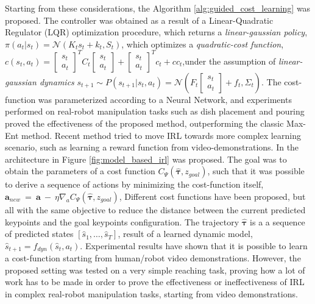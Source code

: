 \label{lqr} Starting from these considerations, the Algorithm \ref{alg:guided_cost_learning} was proposed. The controller was obtained as a result of a Linear-Quadratic Regulator (LQR) optimization procedure, which returns a \textit{linear-gaussian policy}, $\pi(a_{t}|s_{t}) = \mathcal{N}(K_{t}s_{t} + k_{t}, S_{t})$, which optimizes a \textit{quadratic-cost function}, $c(s_{t},a_{t}) = \begin{bmatrix} s_{t} \\ a_{t} \end{bmatrix}^{T}C_{t}\begin{bmatrix} s_{t} \\ a_{t} \end{bmatrix} + \begin{bmatrix} s_{t}\\a_{t}\end{bmatrix}^{T} c_{t} + cc_{t}$,under the assumption of \textit{linear-gaussian dynamics} $s_{t+1} \sim P(s_{t+1}|s_{t},a_{t}) = \mathcal{N}(F_{t}\begin{bmatrix}s_{t}\\ a_{t}\end{bmatrix} + f_{t}, \Sigma_{t})$. The cost-function was parameterized according to a Neural Network, and experiments performed on real-robot manipulation tasks such as dish placement and pouring proved the effectiveness of the proposed method, outperforming the classic Max-Ent method.
%
\newline Recent method \cite{das2021model_based_irl_from_vd} tried to move IRL towards more complex learning scenario, such as learning a reward function from video-demonstrations. In \cite{das2021model_based_irl_from_vd} the architecture in Figure \ref{fig:model_based_irl} was proposed. The goal was to obtain the parameters of a cost function $C_{\Psi}(\hat{\boldsymbol{\tau}}, z_{goal})$, such that it was possible to derive a sequence of actions by minimizing the cost-function itself, $\textbf{a}_{new} \ = \ \textbf{a} \ - \ \eta \nabla_{a} C_{\Psi}(\hat{\boldsymbol{\tau}}, z_{goal})$, Different cost functions have been proposed, but all with the same objective to reduce the distance between the current predicted keypoints and the goal keypoints configuration. The trajectory $\hat{\boldsymbol{\tau}}$ is a a sequence of predicted states $[\hat{s}_{1}, \dots, \hat{s}_{T}]$, result of a learned dynamic model, $\hat{s}_{t+1} = f_{dyn}(\hat{s}_{t}, a_{t})$. Experimental results have shown that it is possible to learn a cost-function starting from human/robot video demonstrations. However, the proposed setting was tested on a very simple reaching task, proving how a lot of work has to be made in order to prove the effectiveness or ineffectiveness of IRL in complex real-robot manipulation tasks, starting from video demonstrations.
